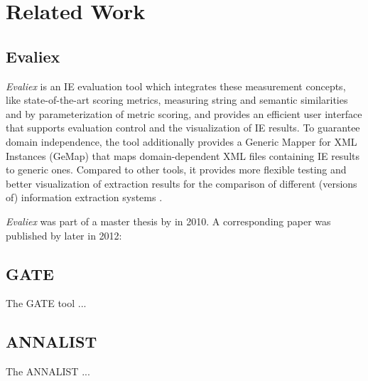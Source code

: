 \section{Related Work}
\label{sec:related-work}

\subsection{Evaliex}
\textit{Evaliex} is an \gls{IE} evaluation tool which integrates these measurement concepts, like state-of-the-art scoring metrics, measuring string and semantic similarities and by parameterization of metric scoring, and provides an efficient user interface that supports evaluation control and the visualization of \gls{IE} results. To guarantee domain independence, the tool additionally provides a Generic Mapper for XML Instances (GeMap) that maps domain-dependent XML files containing \gls{IE} results to generic ones. Compared to other tools, it provides more flexible testing and better visualization of extraction results for the comparison of different (versions of) information extraction systems \cite{Feilmayr:2012}.

\textit{Evaliex}  was part of a master thesis by \citeauthor{Linsmayr:2010} in 2010. A corresponding paper was published by \citeauthor{Feilmayr:2012} later in 2012:

\begin{quote}
\end{quote}

\begin{quote}
\end{quote}

\subsection{\acs{GATE}}
The \gls{GATE} tool ...

\subsection{\acs{ANNALIST}}
The \gls{ANNALIST} ...
